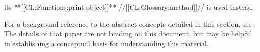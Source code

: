 its **[[CL:Functions:print-object]]** //[[CL:Glossary:method]]// is used instead.

\endsubSection%


For a background reference to the abstract concepts detailed in this section, see \XPPaper.  The details of that paper are not binding on this document, but may be helpful in establishing a conceptual basis for understanding this material.

\endsubsection%

